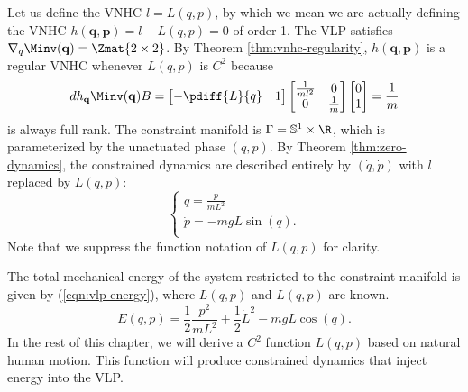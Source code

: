 Let us define the VNHC \(l = L(q,p)\), by which we mean we are
actually defining the VNHC \(h(\mathbf{q},\mathbf{p}) = l - L(q,p) = 0\) of
order 1.
The VLP satisfies
\(\nabla_q \Minv(\mathbf{q}) = \Zmat{2 \times 2}\).
By Theorem \ref{thm:vnhc-regularity},
\(h(\mathbf{q},\mathbf{p})\) is a regular VNHC whenever 
\(L(q,p)\) is \(C^2\) because
\[
   dh_{\mathbf{q}} \Minv(\mathbf{q})B = 
   \begin{bmatrix}
      -\pdiff{L}{q} & 1
   \end{bmatrix}
   \begin{bmatrix}
      \frac{1}{ml^2}  & 0 \\
      0 & \frac{1}{m}
   \end{bmatrix} 
   \begin{bmatrix}
      0 \\ 
      1
   \end{bmatrix}
   = \frac{1}{m}
\]
is always full rank.
The constraint manifold is
\(\Gamma = \mathbb{S}^1 \times \R\), which is parameterized by the unactuated
phase \((q,p)\).
By Theorem \ref{thm:zero-dynamics}, the constrained dynamics
are described entirely by \((\dot{q},\dot{p})\) with \(l\)
replaced by \(L(q,p)\):
\begin{equation}\label{eqn:vlp-hamiltonian}
   \begin{cases}
      \dot{q} = \frac{p}{m L^2} \\
      \dot{p} = -mgL\sin(q)
      . \\ 
   \end{cases}
\end{equation}
Note that we suppress the function notation of \(L(q,p)\) for clarity.

The total mechanical energy of the system restricted to the constraint manifold
is given by (\ref{eqn:vlp-energy}), where \(L(q,p)\) and \(\dot{L}(q,p)\) are
known.
\begin{equation}\label{eqn:vlp-energy}
   E(q,p) = \frac{1}{2} \frac{p^2}{mL^2} + \frac{1}{2}\dot{L}^2 - mgL\cos(q)
   .
\end{equation}
In the rest of this chapter, we will derive a \(C^2\) function \(L(q,p)\) based
on natural human motion.
This function will produce constrained dynamics that inject energy into the VLP.


